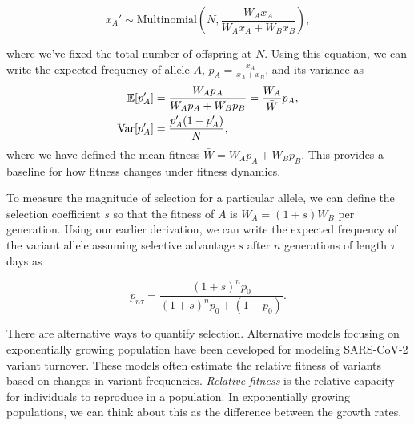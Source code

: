 \begin{equation}
x_A' \sim \text{Multinomial}\left(N, \frac{W_A x_A}{W_A x_A + W_B x_B}\right),
\end{equation}

where we've fixed the total number of offspring at $N$.
Using this equation, we can write the expected frequency of allele $A$, $p_A = \frac{x_A}{x_A + x_B}$, and its variance as
\begin{align}
  \mathbb{E}[p_A'] &= \frac{W_A p_A }{W_A p_A + W_B p_B} = \frac{W_A}{\bar{W}}p_A,\\
  \text{Var}[p_A'] &= \frac{p_A' (1 - p_A')}{N} \label{eq:allele_variance},
\end{align}
where we have defined the mean fitness $\bar{W} = W_A p_A + W_B p_B$.
This provides a baseline for how fitness changes under fitness dynamics.


To measure the magnitude of selection for a particular allele, we can define the selection coefficient $s$ so that the fitness of $A$ is $W_A = (1+s) W_B$ per generation.
Using our earlier derivation, we can write the expected frequency of the variant allele assuming selective advantage $s$ after $n$ generations of length $\tau$ days as

\begin{equation}
p_{n\tau} = \frac{(1+s)^{n}p_{0}}{(1+s)^{n}p_{0} + (1 - p_0)}.
\end{equation}


%
%
%
%

There are alternative ways to quantify selection.
Alternative models focusing on exponentially growing population have been developed for modeling SARS-CoV-2 variant turnover.
These models often estimate the relative fitness of variants based on changes in variant frequencies.
\emph{Relative fitness} is the relative capacity for individuals to reproduce in a population.
In exponentially growing populations, we can think about this as the difference between the growth rates.


